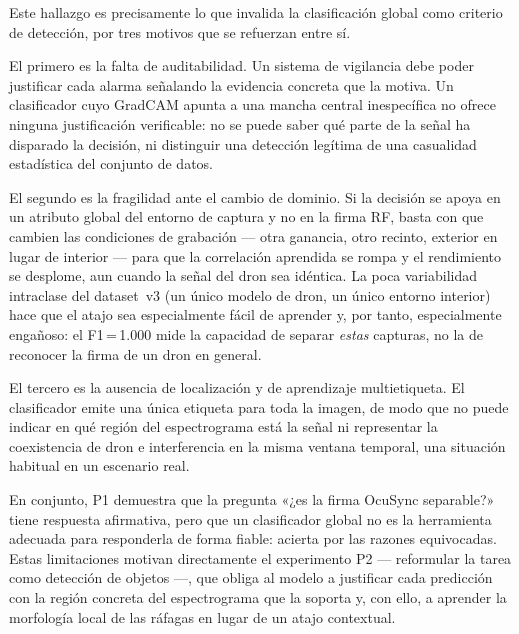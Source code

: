 Este hallazgo es precisamente lo que invalida la clasificación global como criterio de detección, por tres motivos que se refuerzan entre sí.

El primero es la falta de auditabilidad. Un sistema de vigilancia debe poder justificar cada alarma señalando la evidencia concreta que la motiva. Un clasificador cuyo GradCAM apunta a una mancha central inespecífica no ofrece ninguna justificación verificable: no se puede saber qué parte de la señal ha disparado la decisión, ni distinguir una detección legítima de una casualidad estadística del conjunto de datos.

El segundo es la fragilidad ante el cambio de dominio. Si la decisión se apoya en un atributo global del entorno de captura y no en la firma RF, basta con que cambien las condiciones de grabación --- otra ganancia, otro recinto, exterior en lugar de interior --- para que la correlación aprendida se rompa y el rendimiento se desplome, aun cuando la señal del dron sea idéntica. La poca variabilidad intraclase del dataset~v3 (un único modelo de dron, un único entorno interior) hace que el atajo sea especialmente fácil de aprender y, por tanto, especialmente engañoso: el F1\,=\,\num{1,000} mide la capacidad de separar \emph{estas} capturas, no la de reconocer la firma de un dron en general.

El tercero es la ausencia de localización y de aprendizaje multietiqueta. El clasificador emite una única etiqueta para toda la imagen, de modo que no puede indicar en qué región del espectrograma está la señal ni representar la coexistencia de dron e interferencia en la misma ventana temporal, una situación habitual en un escenario real.

En conjunto, P1 demuestra que la pregunta «¿es la firma OcuSync separable?» tiene respuesta afirmativa, pero que un clasificador global no es la herramienta adecuada para responderla de forma fiable: acierta por las razones equivocadas. Estas limitaciones motivan directamente el experimento P2 --- reformular la tarea como detección de objetos ---, que obliga al modelo a justificar cada predicción con la región concreta del espectrograma que la soporta y, con ello, a aprender la morfología local de las ráfagas en lugar de un atajo contextual.
